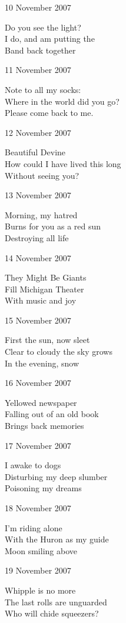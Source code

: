 \documentclass[12pt]{article}
\begin{document}
\newpage

10 November 2007

Do you see the light? \\
I do, and am putting the \\
Band back together

11 November 2007

Note to all my socks: \\
Where in the world did you go? \\
Please come back to me.

12 November 2007

Beautiful Devine \\
How could I have lived this long \\
Without seeing you?

13 November 2007 

Morning, my hatred \\
Burns for you as a red sun \\
Destroying all life

14 November 2007

They Might Be Giants \\
Fill Michigan Theater \\
With music and joy

15 November 2007

First the sun, now sleet \\
Clear to cloudy the sky grows \\
In the evening, snow

16 November 2007

Yellowed newspaper \\
Falling out of an old book \\
Brings back memories


\newpage

17 November 2007

I awake to dogs \\
Disturbing my deep slumber \\
Poisoning my dreams

18 November 2007

I'm riding alone \\
With the Huron as my guide \\
Moon smiling above

19 November 2007

Whipple is no more \\
The last rolls are unguarded \\
Who will chide squeezers?
\end{document}
